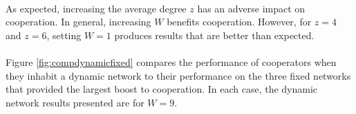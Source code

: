 \documentclass{article}
\begin{document}
	\paragraph{}As expected, increasing the average degree $z$ has an adverse impact on cooperation.  In general, increasing $W$ benefits cooperation.  However, for $z=4$ and $z=6$, setting $W=1$ produces results that are better than expected.
	\paragraph{}Figure \ref{fig:compdynamicfixed} compares the performance of cooperators when they inhabit a dynamic network to their performance on the three fixed networks that provided the largest boost to cooperation.  In each case, the dynamic network results presented are for $W=9$.
\end{document}
